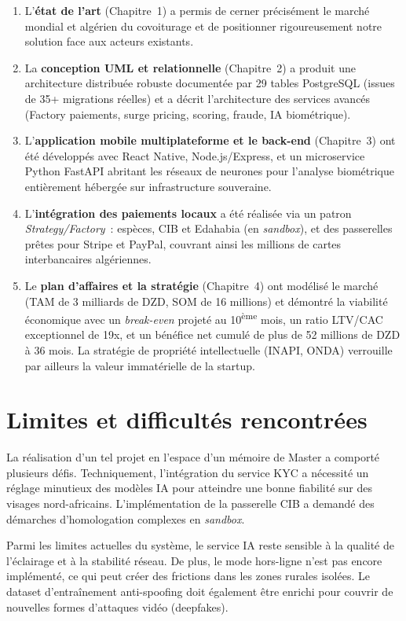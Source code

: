 \documentclass[12pt, a4paper, oneside]{report}
\begin{document}
\begin{enumerate}
  \item L'\textbf{état de l'art} (Chapitre~1) a permis de cerner précisément le marché mondial et algérien du covoiturage et de positionner rigoureusement notre solution face aux acteurs existants.
  \item La \textbf{conception UML et relationnelle} (Chapitre~2) a produit une architecture distribuée robuste documentée par 29 tables PostgreSQL (issues de 35+ migrations réelles) et a décrit l'architecture des services avancés (Factory paiements, surge pricing, scoring, fraude, IA biométrique).
  \item L'\textbf{application mobile multiplateforme et le back-end} (Chapitre~3) ont été développés avec React Native, Node.js/Express, et un microservice Python FastAPI abritant les réseaux de neurones pour l'analyse biométrique entièrement hébergée sur infrastructure souveraine.
  \item L'\textbf{intégration des paiements locaux} a été réalisée via un patron \textit{Strategy/Factory}~: espèces, CIB et Edahabia (en \textit{sandbox}), et des passerelles prêtes pour Stripe et PayPal, couvrant ainsi les millions de cartes interbancaires algériennes.
  \item Le \textbf{plan d'affaires et la stratégie} (Chapitre~4) ont modélisé le marché (TAM de 3 milliards de DZD, SOM de 16 millions) et démontré la viabilité économique avec un \textit{break-even} projeté au 10\textsuperscript{ème} mois, un ratio LTV/CAC exceptionnel de 19x, et un bénéfice net cumulé de plus de 52 millions de DZD à 36 mois. La stratégie de propriété intellectuelle (INAPI, ONDA) verrouille par ailleurs la valeur immatérielle de la startup.
\end{enumerate}

\section*{Limites et difficultés rencontrées}

La réalisation d'un tel projet en l'espace d'un mémoire de Master a comporté plusieurs défis. Techniquement, l'intégration du service KYC a nécessité un réglage minutieux des modèles IA pour atteindre une bonne fiabilité sur des visages nord-africains. L'implémentation de la passerelle CIB a demandé des démarches d'homologation complexes en \textit{sandbox}. 

Parmi les limites actuelles du système, le service IA reste sensible à la qualité de l'éclairage et à la stabilité réseau. De plus, le mode hors-ligne n'est pas encore implémenté, ce qui peut créer des frictions dans les zones rurales isolées. Le dataset d'entraînement anti-spoofing doit également être enrichi pour couvrir de nouvelles formes d'attaques vidéo (deepfakes).
\end{document}
